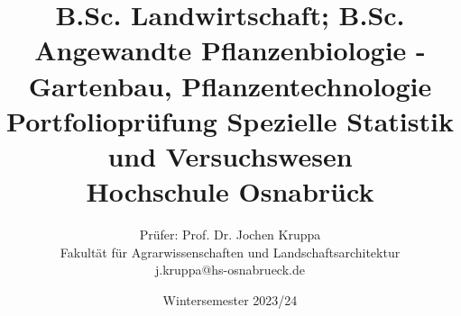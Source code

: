 \setlength{\parindent}{0cm}
\usepackage{booktabs}
\usepackage{amsmath}
\usepackage[normalem]{ulem}
\usepackage{hyperref}
\hypersetup{
    colorlinks=true,       %
    linkcolor=black,          %
    urlcolor=magenta           %
}
\renewcommand{\familydefault}{\sfdefault}

\def\examdate{Wintersemester 2023/24}
\def\exammodule{B.Sc. Landwirtschaft; B.Sc. Angewandte Pflanzenbiologie - Gartenbau, Pflanzentechnologie}
\def\lecture{Spezielle Statistik und Versuchswesen}
\def\examtitle{Portfolioprüfung \lecture}

\title{
\large \exammodule \\[5Ex]
\Huge \examtitle \\[2Ex] 
\Large Hochschule Osnabr{\"u}ck
}
\author{Pr{\"u}fer: Prof. Dr. Jochen Kruppa \\
Fakult{\"a}t f{\"u}r Agrarwissenschaften und Landschaftsarchitektur \\ 
j.kruppa@hs-osnabrueck.de}
\date{\examdate}